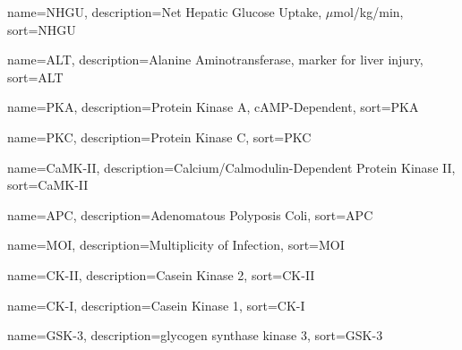 {
  name=NHGU,
  description={Net Hepatic Glucose Uptake, $\mu$mol/kg/min},
  sort=NHGU
}

{
  name=ALT,
  description={Alanine Aminotransferase, marker for liver injury},
  sort=ALT
}

{
  name=PKA,
  description={Protein Kinase A, cAMP-Dependent},
  sort=PKA
}

{
  name=PKC,
  description={Protein Kinase C},
  sort=PKC
}

{
  name=CaMK-II,
  description={Calcium/Calmodulin-Dependent Protein Kinase II},
  sort=CaMK-II
}

{
  name=APC,
  description={Adenomatous Polyposis Coli},
  sort=APC
}

{
  name=MOI,
  description={Multiplicity of Infection},
  sort=MOI
}

{
  name=CK-II,
  description={Casein Kinase 2},
  sort=CK-II
}

{
  name=CK-I,
  description={Casein Kinase 1},
  sort=CK-I
}

{
  name=GSK-3,
  description={glycogen synthase kinase 3\textbeta{}},
  sort=GSK-3
}